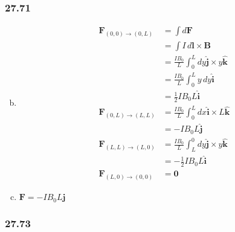 \documentclass{article}
\begin{document}
\subsubsection{27.71}

\begin{enumerate}[(a)]
  \setcounter{enumi}{1}
  \item

        \begin{align*}
          \mathbf{F}_{(0, 0) \rightarrow (0, L)} & = \int d \mathbf{F}                                                      \\
                                                 & = \int I \,d \mathbf{l} \times \mathbf{B}                                \\
                                                 & = \frac{I B_0}{L} \int_0^L dy \hat{\mathbf{j}} \times y \hat{\mathbf{k}} \\
                                                 & = \frac{I B_0}{L} \int_0^L y \,dy \hat{\mathbf{i}}                       \\
                                                 & = \frac{1}{2} I B_0 L \hat{\mathbf{i}}                                   \\
          \mathbf{F}_{(0, L) \rightarrow (L, L)} & = \frac{I B_0}{L} \int_0^L dx \hat{\mathbf{i}} \times L \hat{\mathbf{k}} \\
                                                 & = -I B_0 L \hat{\mathbf{j}}                                              \\
          \mathbf{F}_{(L, L) \rightarrow (L, 0)} & = \frac{I B_0}{L} \int_L^0 dy \hat{\mathbf{j}} \times y \hat{\mathbf{k}} \\
                                                 & = -\frac{1}{2} I B_0 L \hat{\mathbf{i}}                                  \\
          \mathbf{F}_{(L, 0) \rightarrow (0, 0)} & = \mathbf{0}
        \end{align*}

  \item $\mathbf{F} = -I B_0 L \hat{\mathbf{j}}$
\end{enumerate}

\subsubsection{27.73}
\end{document}
